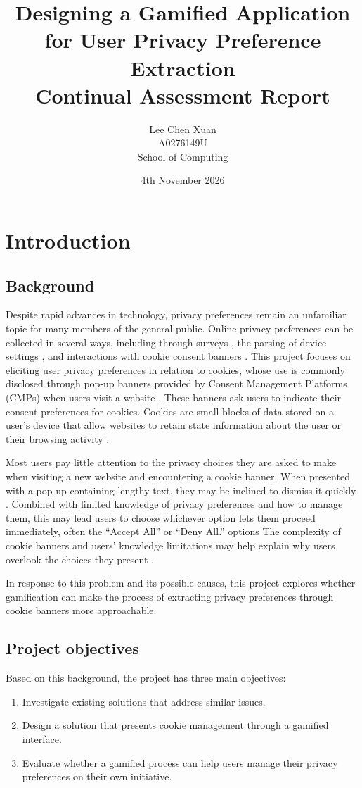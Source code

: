 \documentclass[11pt,a4paper]{report}
\title{\textbf{Designing a Gamified Application for User Privacy Preference Extraction}\\[0.5em]
       \large Continual Assessment Report}
\author{Lee Chen Xuan\\[0.3em] A0276149U\\[0.3em] School of Computing}
\date{4th November 2026}
\begin{document}
\maketitle

{\small\tableofcontents}
\clearpage

\chapter{Introduction}
\section{Background}
Despite rapid advances in technology, privacy preferences remain an unfamiliar topic for many members of the general public. Online privacy preferences can be collected in several ways, including through surveys \cite{asif2022privacy}, the parsing of device settings \cite{noauthor_undated-vk}, and interactions with cookie consent banners \cite{Cao2025-gx}. This project focuses on eliciting user privacy preferences in relation to cookies, whose use is commonly disclosed through pop-up banners provided by Consent Management Platforms (CMPs) when users visit a website \cite{noauthor_undated-lq}. These banners ask users to indicate their consent preferences for cookies. Cookies are small blocks of data stored on a user's device that allow websites to retain state information about the user or their browsing activity \cite{Wikipedia_contributors2026-wp}.

Most users pay little attention to the privacy choices they are asked to make when visiting a new website and encountering a cookie banner. When presented with a pop-up containing lengthy text, they may be inclined to dismiss it quickly \cite{Tankala2023-ay}. Combined with limited knowledge of privacy preferences and how to manage them, this may lead users to choose whichever option lets them proceed immediately, often the ``Accept All'' or ``Deny All.'' options The complexity of cookie banners and users' knowledge limitations may help explain why users overlook the choices they present \cite{Safna2025-ng}.

In response to this problem and its possible causes, this project explores whether gamification can make the process of extracting privacy preferences through cookie banners more approachable.

\section{Project objectives}
Based on this background, the project has three main objectives:
\begin{enumerate}
  \item Investigate existing solutions that address similar issues.
  \item Design a solution that presents cookie management through a gamified interface.
  \item Evaluate whether a gamified process can help users manage their privacy preferences on their own initiative.
\end{enumerate}
\end{document}
